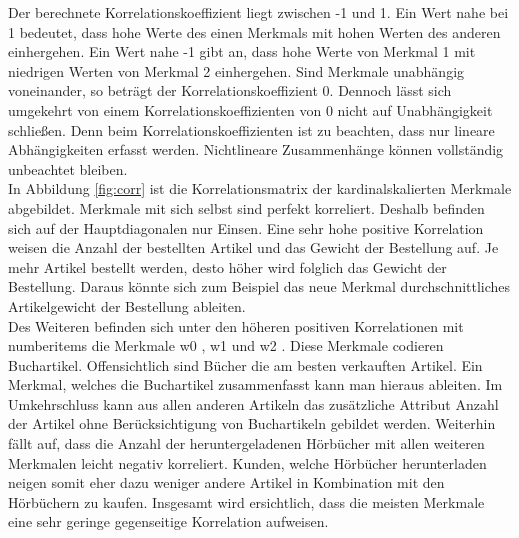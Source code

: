 Der berechnete Korrelationskoeffizient liegt zwischen -1 und 1. Ein Wert nahe bei 1 bedeutet, dass hohe Werte des einen Merkmals mit hohen Werten des anderen einhergehen. Ein Wert nahe -1 gibt an, dass hohe Werte von Merkmal 1 mit niedrigen Werten von Merkmal 2 einhergehen. Sind Merkmale unabhängig voneinander, so beträgt der Korrelationskoeffizient 0. Dennoch lässt sich umgekehrt von einem Korrelationskoeffizienten von 0 nicht auf Unabhängigkeit schließen. Denn beim Korrelationskoeffizienten ist zu beachten, dass nur lineare Abhängigkeiten erfasst werden. Nichtlineare Zusammenhänge können vollständig unbeachtet bleiben.\\

In Abbildung \ref{fig:corr} ist die Korrelationsmatrix der kardinalskalierten Merkmale abgebildet. Merkmale mit sich selbst sind perfekt korreliert. Deshalb befinden sich auf der Hauptdiagonalen nur Einsen. Eine sehr hohe positive Korrelation weisen die Anzahl der bestellten Artikel und das Gewicht der Bestellung auf. Je mehr Artikel bestellt werden, desto höher wird folglich das Gewicht der Bestellung. Daraus könnte sich zum Beispiel das neue Merkmal durchschnittliches Artikelgewicht der Bestellung ableiten.\\ 

Des Weiteren befinden sich unter den höheren positiven Korrelationen mit  numberitems  die Merkmale  w0 ,  w1  und  w2 . Diese Merkmale codieren Buchartikel. Offensichtlich sind Bücher die am besten verkauften Artikel. Ein Merkmal, welches die Buchartikel zusammenfasst kann man hieraus ableiten. Im Umkehrschluss kann aus allen anderen Artikeln das zusätzliche Attribut Anzahl der Artikel ohne Berücksichtigung von Buchartikeln gebildet werden. Weiterhin fällt auf, dass die Anzahl der heruntergeladenen Hörbücher mit allen weiteren Merkmalen leicht negativ korreliert. Kunden, welche Hörbücher herunterladen neigen somit eher dazu weniger andere Artikel in Kombination mit den Hörbüchern zu kaufen. Insgesamt wird ersichtlich, dass die meisten Merkmale eine sehr geringe gegenseitige Korrelation aufweisen.\\



